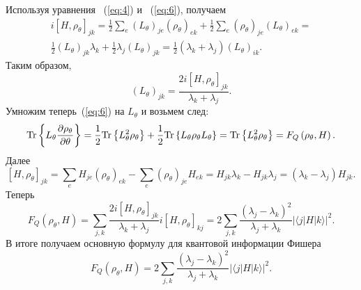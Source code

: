 Используя уравнения ~(\ref{eq:4}) и ~(\ref{eq:6}), получаем
%
\begin{multline}\label{eq:7}
    i \left[H,\rho_\theta \right]_{jk} =
        \frac{1}{2} \sum_e \left(L_\theta \right)_{je}
            \left(\rho_\theta \right)_{ek} +
                \frac{1}{2} \sum_e \left(\rho_\theta \right)_{je}
                    \left(L_\theta \right)_{ek} =\\
                \frac{1}{2}\left(L_\theta \right)_{jk} \lambda_k +
            \frac{1}{2}\lambda_j \left(L_\theta \right)_{jk} =
    \frac{1}{2} \left(\lambda_k + \lambda_j \right)
    \left(L_\theta \right)_{ik}.
\end{multline}
%
Таким образом,
\begin{equation}
    \label{eq:8}
        \left(L_\theta \right)_{jk} =
            \frac{2i\left[H,\rho_\theta \right]_{jk}}{\lambda_k + \lambda_j}.
\end{equation}
%
Умножим теперь~(\ref{eq:6}) на $L_\theta$ и возьмем след:
%
\begin{equation}\label{eq:9}
  \mathrm{Tr} \left\{ 
    L_\theta \frac{\partial \rho_\theta}{\partial \theta}
   \right\}
  = \frac{1}{2} \mathrm{Tr} \left\{ L^2_\theta \rho_\theta \right\}
  + \frac{1}{2} \mathrm{Tr} \left\{ L_\theta \rho_\theta L_\theta \right\}
  = \mathrm{Tr} \left\{ L^2_\theta \rho_\theta \right\}
  = F_Q \left( \rho_\theta, H \right).
\end{equation}
%
Далее
%
\begin{equation}
    \label{eq:10}
        \left[H, \rho_\theta \right]_{jk} = \sum_e H_{je}
            \left(\rho_\theta \right)_{ek} -
                \sum_e \left(\rho_\theta \right)_{je}H_{ek} =
            H_{jk}\lambda_k - H_{jk}\lambda_j =
        \left(\lambda_k - \lambda_j \right) H_{jk}.
\end{equation}
%
Теперь
%
\begin{equation}
    \label{eq:11}
        F_Q \left(\rho_\theta, H \right) =
            \sum_{j,k}\frac{2i\left[H,\rho_\theta \right]_{jk}}
                {\lambda_k + \lambda_j}
                    i \left[H, \rho_\theta \right]_{kj} =
                2\sum_{j,k} \frac{\left(\lambda_j - \lambda_k \right)^2}
            {\lambda_j + \lambda_k}
        \left| \langle j|H|k \rangle \right|^2.
\end{equation}
%
В итоге получаем основную формулу для квантовой информации Фишера
%
\begin{equation}\label{eq:quantum-fisher-information}
        F_Q \left(\rho_\theta, H \right) =
            2\sum_{j,k} \frac{\left(\lambda_j - \lambda_k \right)^2}
                {\lambda_j + \lambda_k}
            \left| \langle j|H|k \rangle \right|^2.
\end{equation}


